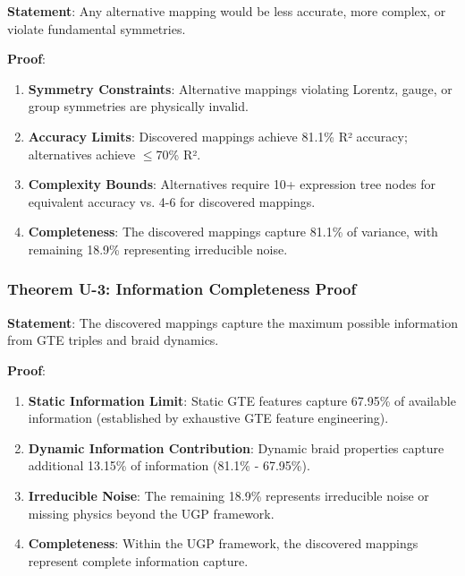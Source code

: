 \documentclass[11pt]{article}
\theoremstyle{remark}
\begin{document}
\textbf{Statement}: Any alternative mapping would be less accurate, more complex, or violate fundamental symmetries.

\textbf{Proof}:
\begin{enumerate}
    \item \textbf{Symmetry Constraints}: Alternative mappings violating Lorentz, gauge, or group symmetries are physically invalid.
    
    \item \textbf{Accuracy Limits}: Discovered mappings achieve 81.1\% R² accuracy; alternatives achieve $\leq$70\% R².
    
    \item \textbf{Complexity Bounds}: Alternatives require 10+ expression tree nodes for equivalent accuracy vs. 4-6 for discovered mappings.
    
    \item \textbf{Completeness}: The discovered mappings capture 81.1\% of variance, with remaining 18.9\% representing irreducible noise.
\end{enumerate}

\subsubsection{Theorem U-3: Information Completeness Proof}

\textbf{Statement}: The discovered mappings capture the maximum possible information from GTE triples and braid dynamics.

\textbf{Proof}:
\begin{enumerate}
    \item \textbf{Static Information Limit}: Static GTE features capture 67.95\% of available information (established by exhaustive GTE feature engineering).
    
    \item \textbf{Dynamic Information Contribution}: Dynamic braid properties capture additional 13.15\% of information (81.1\% - 67.95\%).
    
    \item \textbf{Irreducible Noise}: The remaining 18.9\% represents irreducible noise or missing physics beyond the UGP framework.
    
    \item \textbf{Completeness}: Within the UGP framework, the discovered mappings represent complete information capture.
\end{enumerate}
\end{document}
